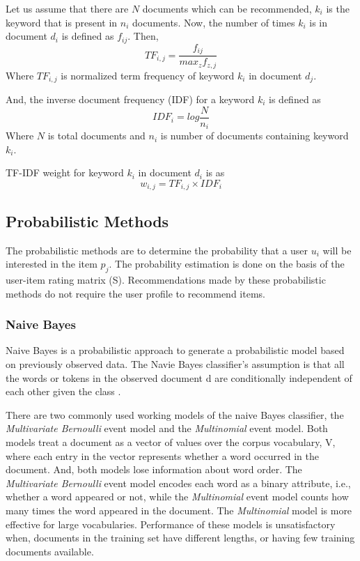\documentclass[conference]{IEEEtran}
\begin{document}
Let us assume that there are \(N\) documents which can be recommended, \(k_{i}\) is the keyword that is present in \(n_{i}\) documents. Now, the number of times \(k_{i}\) is in document \(d_{i}\) is defined as \(f_{ij}\). Then,
\begin{equation}
    TF_{i,j} = \frac{f_{ij}}{max_{z}f_{z,j}}
\end{equation}
Where \(TF_{i,j}\) is normalized term frequency of keyword \(k_{i}\) in document \(d_{j}\). 

And, the inverse document frequency (IDF) for a keyword \(k_{i}\) is defined as
\begin{equation}
    IDF_{i} = log\frac{N}{n_{i}}
\end{equation}
Where \(N\) is total documents and \(n_{i}\) is number of documents containing keyword \(k_{i}\).

TF-IDF weight for keyword \(k_{i}\) in document \(d_{i}\) is as
\begin{equation}
    w_{i,j} = {TF_{i,j}} \times {IDF_{i}}
\end{equation}

\subsection{Probabilistic Methods}\label{BB}
The probabilistic methods are to determine the probability that a user \(u_{i}\) will be interested in the item \(p_{j}\). The probability estimation is done on the basis of the user-item rating matrix (S).
Recommendations made by these probabilistic methods do not require the user profile to recommend items.

\subsubsection{Naive Bayes}\label{AA}
Naive Bayes is a probabilistic approach to generate a probabilistic model based on previously observed data. The Navie Bayes classifier's assumption is that all the words or tokens in the observed document d are conditionally independent of each other given the class \cite{b13}.

There are two commonly used working models of the naive Bayes classifier, the \textit{Multivariate Bernoulli} event model and the \textit{Multinomial} event model. Both models treat a document as a vector of values over the corpus vocabulary, V, where each entry in the vector represents whether a word occurred in the document. And, both models lose information about word order. The \textit{Multivariate Bernoulli} event model encodes each word as a binary attribute, i.e., whether a word appeared or not, while the \textit{Multinomial} event model counts how many times the word appeared in the document. The \textit{Multinomial} model is more effective for large vocabularies.
Performance of these models is unsatisfactory when, documents in the training set have different lengths, or having few training documents available.
\end{document}
